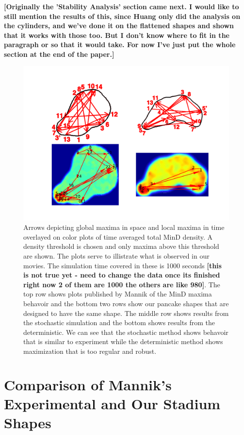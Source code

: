 \documentclass[letterpaper,twocolumn,amsmath,amssymb,pre]{revtex4-1}
\newcommand{\red}[1]{{\bf \color{red} #1}}
\newcommand{\fixme}[1]{\red{[#1]}}
\begin{document}
\fixme{Originally the 'Stability Analysis' section came next.  I would
  like to still mention the results of this, since Huang only did the
  analysis on the cylinders, and we've done it on the flattened shapes
  and shown that it works with those too.  But I don't know where to
  fit in the paragraph or so that it would take.  For now I've just
  put the whole section at the end of the paper.}

\begin{figure}
  \centering
  \includegraphics[width=\textwidth]{../paper/plot-ave}
  \caption{Arrows depicting global maxima in space and local
    maxima in
    time overlayed on color plots of time averaged total MinD density.
    A density threshold is chosen and only maxima above this threshold
    are shown. The plots serve to illistrate what is observed in our
    movies.  The simulation time covered in these is 1000 seconds
    \fixme{this is not true yet - need to change the data once its
      finished right now 2 of them are 1000 the others are like 980}.
    The top row shows plots published by Mannik of the MinD maxima
    behavoir and the bottom two rows show our pancake shapes that are
    designed to have the same shape.  The middle row shows results
    from the stochastic simulation and the bottom shows results from
    the deterministic.  We can see that the stochastic method shows
    behavoir that is similar to experiment while the deterministic
    method shows maximization that is too regular and robust.}
  \label{randst-plot-ave}
\end{figure}

\section{Comparison of Mannik's Experimental and Our Stadium Shapes}
\end{document}
